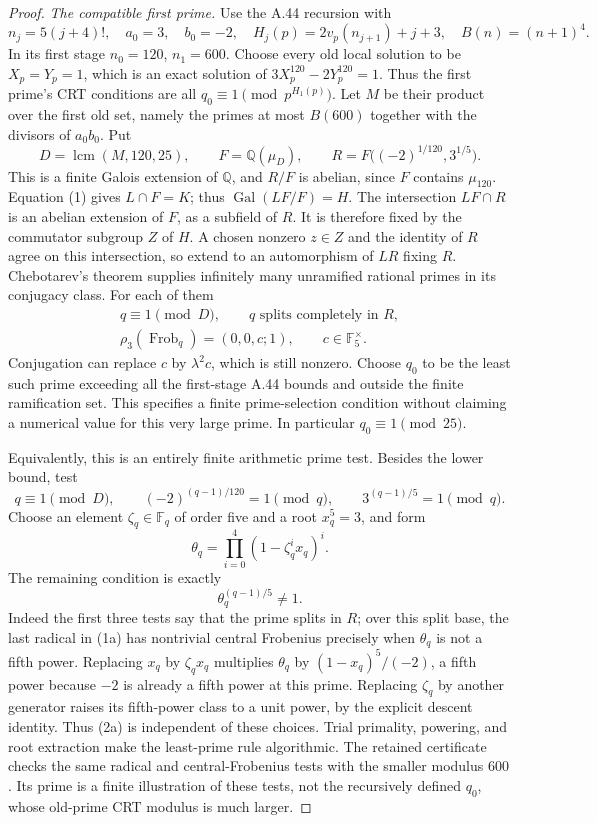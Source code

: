 \begin{proof}
\emph{The compatible first prime.}
Use the A.44 recursion with
\[
 n_j=5(j+4)!,\quad a_0=3,\quad b_0=-2,
 \quad H_j(p)=2v_p(n_{j+1})+j+3,
 \quad B(n)=(n+1)^4.
\]
In its first stage \(n_0=120\), \(n_1=600\).
Choose every old local solution to be \(X_p=Y_p=1\),
which is an exact solution of \(3X_p^{120}-2Y_p^{120}=1\).
Thus the first prime's CRT conditions are all
\(q_0\equiv1\pmod{p^{H_1(p)}}\). Let \(M\)
be their product over the first old set, namely the
primes at most \(B(600)\) together with the divisors
of \(a_0b_0\). Put
\[
 D=\operatorname{lcm}(M,120,25),\qquad
 F=\mathbb Q(\mu_D),\qquad
 R=F\bigl((-2)^{1/120},3^{1/5}\bigr).
\]
This is a finite Galois extension of \(\mathbb Q\),
and \(R/F\) is abelian, since \(F\) contains
\(\mu_{120}\). Equation (1) gives
\(L\cap F=K\); thus
\(\operatorname{Gal}(LF/F)=H\).
The intersection \(LF\cap R\) is an abelian
extension of \(F\), as a subfield of \(R\).
It is therefore fixed by the commutator subgroup
\(Z\) of \(H\). A chosen nonzero \(z\in Z\)
and the identity of \(R\) agree on this intersection,
so extend to an automorphism of \(LR\) fixing \(R\).
Chebotarev's theorem
\cite[Theorem 8.31]{GhostMilneANT} supplies infinitely
many unramified rational primes in its conjugacy class.
For each of them
\[
 \begin{gathered}
 q\equiv1\pmod D,\qquad q\text{ splits completely in }R,\\
 \rho_3(\operatorname{Frob}_q)=(0,0,c;1),
                         \qquad c\in\mathbb F_5^\times.
 \end{gathered}                                      \tag{2}
\]
Conjugation can replace \(c\) by \(\lambda^2c\),
which is still nonzero. Choose \(q_0\) to be the
least such prime exceeding all the first-stage A.44
bounds and outside the finite ramification set.
This specifies a finite prime-selection condition
without claiming a numerical value for this very large
prime. In particular \(q_0\equiv1\pmod{25}\).

Equivalently, this is an entirely finite arithmetic
prime test. Besides the lower bound, test
\[
 q\equiv1\pmod D,\qquad
 (-2)^{(q-1)/120}=1\pmod q,\qquad
 3^{(q-1)/5}=1\pmod q.
\]
Choose an element \(\zeta_q\in\mathbb F_q\) of
order five and a root \(x_q^5=3\), and form
\[
 \theta_q=\prod_{i=0}^4(1-\zeta_q^ix_q)^i.
\]
The remaining condition is exactly
\[
                   \theta_q^{(q-1)/5}\ne1.          \tag{2a}
\]
Indeed the first three tests say that the prime splits
in \(R\); over this split base, the last radical in
(1a) has nontrivial central Frobenius precisely when
\(\theta_q\) is not a fifth power. Replacing
\(x_q\) by \(\zeta_qx_q\) multiplies \(\theta_q\)
by \((1-x_q)^5/(-2)\), a fifth power because
\(-2\) is already a fifth power at this prime.
Replacing \(\zeta_q\) by another generator raises
its fifth-power class to a unit power, by the explicit
descent identity. Thus (2a) is independent of these
choices. Trial primality, powering, and root extraction
make the least-prime rule algorithmic.
The retained certificate
checks the same radical and central-Frobenius tests
with the smaller modulus \(600\). Its prime is a
finite illustration of these tests, not the recursively
defined \(q_0\), whose old-prime CRT modulus is much
larger.


\end{proof}
